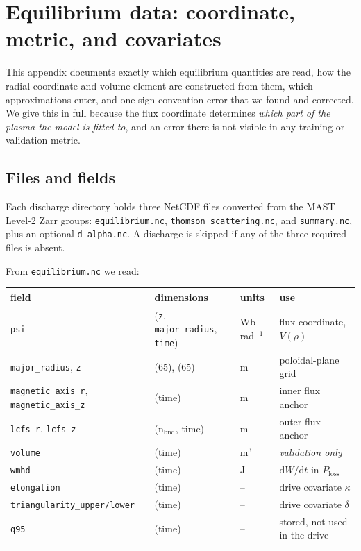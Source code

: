 
\section{Equilibrium data: coordinate, metric, and covariates}
\label{app:equilibrium}

This appendix documents exactly which equilibrium quantities are read, how
the radial coordinate and volume element are constructed from them, which
approximations enter, and one sign-convention error that we found and
corrected. We give this in full because the flux coordinate determines
\emph{which part of the plasma the model is fitted to}, and an error there
is not visible in any training or validation metric.

\subsection{Files and fields}

Each discharge directory holds three NetCDF files converted from the MAST
Level-2 Zarr groups: \texttt{equilibrium.nc}, \texttt{thomson\_scattering.nc},
and \texttt{summary.nc}, plus an optional \texttt{d\_alpha.nc}. A discharge
is skipped if any of the three required files is absent.

From \texttt{equilibrium.nc} we read:

\begin{center}\small
\begin{tabular}{llll}
\toprule
field & dimensions & units & use \\
\midrule
\texttt{psi} & (\texttt{z}, \texttt{major\_radius}, \texttt{time}) & Wb\,rad$^{-1}$ & flux coordinate, $V(\rho)$ \\
\texttt{major\_radius}, \texttt{z} & (65), (65) & m & poloidal-plane grid \\
\texttt{magnetic\_axis\_r}, \texttt{magnetic\_axis\_z} & (time) & m & inner flux anchor \\
\texttt{lcfs\_r}, \texttt{lcfs\_z} & (n$_{\mathrm{bnd}}$, time) & m & outer flux anchor \\
\texttt{volume} & (time) & m$^3$ & \emph{validation only} \\
\texttt{wmhd} & (time) & J & $\mathrm{d}W/\mathrm{d}t$ in $P_{\mathrm{loss}}$ \\
\texttt{elongation} & (time) & -- & drive covariate $\kappa$ \\
\texttt{triangularity\_upper/lower} & (time) & -- & drive covariate $\delta$ \\
\texttt{q95} & (time) & -- & stored, not used in the drive \\
\bottomrule
\end{tabular}
\end{center}

